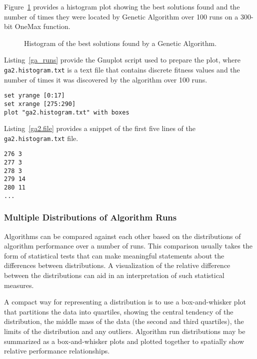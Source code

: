 Figure~\ref{plot:ga2} provides a histogram plot showing the best solutions found and the number of times they were located by Genetic Algorithm over 100 runs on a 300-bit OneMax function.

\begin{figure}[htp]
\centering

\caption{Histogram of the best solutions found by a Genetic Algorithm.}
\label{plot:ga2}
\end{figure}

Listing~\ref{ga_runs} provide the Gnuplot script used to prepare the plot, where \texttt{ga2.histogram.txt} is a text file that contains discrete fitness values and the number of times it was discovered by the algorithm over 100 runs.

\begin{lstlisting}[caption=Gnuplot script for creating a histogram., label=ga_runs]
set yrange [0:17]
set xrange [275:290]
plot "ga2.histogram.txt" with boxes
\end{lstlisting}

Listing~\ref{ga2.file} provides a snippet of the first five lines of the \texttt{ga2.histogram.txt} file.

\begin{lstlisting}[caption=Snippet of the \texttt{ga2.histogram.txt} file., label=ga2.file]
276 3
277 3
278 3
279 14
280 11
...
\end{lstlisting}

\subsubsection{Multiple Distributions of Algorithm Runs}
Algorithms can be compared against each other based on the distributions of algorithm performance over a number of runs. This comparison usually takes the form of statistical tests that can make meaningful statements about the differences between distributions. A visualization of the relative difference between the distributions can aid in an interpretation of such statistical measures.

A compact way for representing a distribution is to use a box-and-whisker plot that partitions the data into quartiles, showing the central tendency of the distribution, the middle mass of the data (the second and third quartiles), the limits of the distribution and any outliers. Algorithm run distributions may be summarized as a box-and-whisker plots and plotted together to spatially show relative performance relationships.

